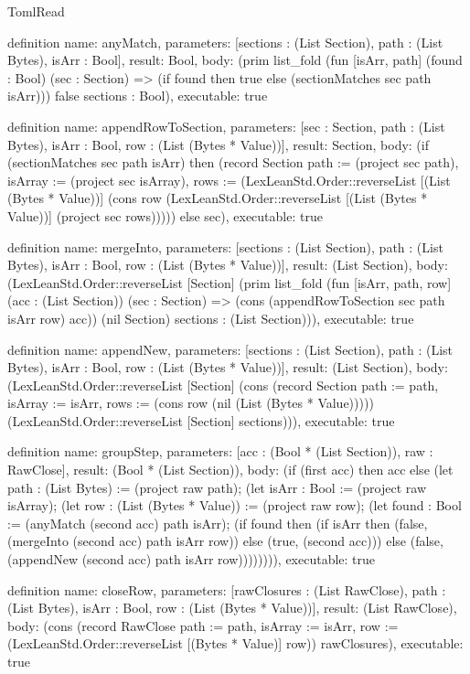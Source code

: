\begin{lexlean}{TomlRead}
\begin{semanticmodule}
definition{
  name: anyMatch,
  parameters: [sections : (List Section), path : (List Bytes), isArr : Bool],
  result: Bool,
  body: (prim list_fold (fun [isArr, path] (found : Bool) (sec : Section) => (if found then true else (sectionMatches sec path isArr))) false sections : Bool),
  executable: true
}

definition{
  name: appendRowToSection,
  parameters: [sec : Section, path : (List Bytes), isArr : Bool, row : (List (Bytes * Value))],
  result: Section,
  body: (if (sectionMatches sec path isArr) then (record Section {path := (project sec path), isArray := (project sec isArray), rows := (LexLeanStd.Order::reverseList [(List (Bytes * Value))] (cons row (LexLeanStd.Order::reverseList [(List (Bytes * Value))] (project sec rows))))}) else sec),
  executable: true
}

definition{
  name: mergeInto,
  parameters: [sections : (List Section), path : (List Bytes), isArr : Bool, row : (List (Bytes * Value))],
  result: (List Section),
  body: (LexLeanStd.Order::reverseList [Section] (prim list_fold (fun [isArr, path, row] (acc : (List Section)) (sec : Section) => (cons (appendRowToSection sec path isArr row) acc)) (nil Section) sections : (List Section))),
  executable: true
}

definition{
  name: appendNew,
  parameters: [sections : (List Section), path : (List Bytes), isArr : Bool, row : (List (Bytes * Value))],
  result: (List Section),
  body: (LexLeanStd.Order::reverseList [Section] (cons (record Section {path := path, isArray := isArr, rows := (cons row (nil (List (Bytes * Value))))}) (LexLeanStd.Order::reverseList [Section] sections))),
  executable: true
}

definition{
  name: groupStep,
  parameters: [acc : (Bool * (List Section)), raw : RawClose],
  result: (Bool * (List Section)),
  body: (if (first acc) then acc else (let path : (List Bytes) := (project raw path); (let isArr : Bool := (project raw isArray); (let row : (List (Bytes * Value)) := (project raw row); (let found : Bool := (anyMatch (second acc) path isArr); (if found then (if isArr then (false, (mergeInto (second acc) path isArr row)) else (true, (second acc))) else (false, (appendNew (second acc) path isArr row)))))))),
  executable: true
}

definition{
  name: closeRow,
  parameters: [rawClosures : (List RawClose), path : (List Bytes), isArr : Bool, row : (List (Bytes * Value))],
  result: (List RawClose),
  body: (cons (record RawClose {path := path, isArray := isArr, row := (LexLeanStd.Order::reverseList [(Bytes * Value)] row)}) rawClosures),
  executable: true
}


\end{semanticmodule}
\end{lexlean}
